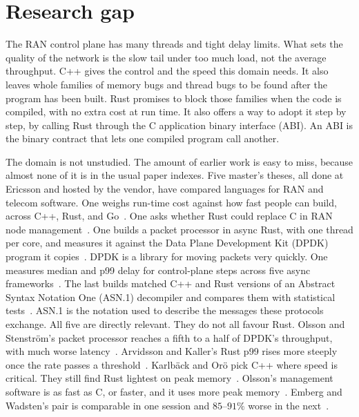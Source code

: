 \documentclass[english,oneside,a4paper,censored,csm,software-track-2020]{HYthesisML}
\begin{document}
\section{Research gap}\label{sec:gap}
The RAN control plane has many threads and tight delay limits.
What sets the quality of the network is the slow tail under too much load, not the average throughput.
C++ gives the control and the speed this domain needs.
It also leaves whole families of memory bugs and thread bugs to be found after the program has been built.
Rust promises to block those families when the code is compiled, with no extra cost at run time.
It also offers a way to adopt it step by step, by calling Rust through the C application binary interface (ABI).
An ABI is the binary contract that lets one compiled program call another.

The domain is not unstudied.
The amount of earlier work is easy to miss, because almost none of it is in the usual paper indexes.
Five master's theses, all done at Ericsson and hosted by the vendor, have compared languages for RAN and telecom software.
One weighs run-time cost against how fast people can build, across C++, Rust, and Go~\cite{karlback2021ran}.
One asks whether Rust could replace C in RAN node management~\cite{olsson2023ranmgmt}.
One builds a packet processor in async Rust, with one thread per core, and measures it against the Data Plane Development Kit (DPDK) program it copies~\cite{olsson2023asyncpackets}.
DPDK is a library for moving packets very quickly.
One measures median and p99 delay for control-plane steps across five async frameworks~\cite{arvidsson2025async}.
The last builds matched C++ and Rust versions of an Abstract Syntax Notation One (ASN.1) decompiler and compares them with statistical tests~\cite{emberg2023asn1}.
ASN.1 is the notation used to describe the messages these protocols exchange.
All five are directly relevant. They do not all favour Rust.
Olsson and Stenstr\"om's packet processor reaches a fifth to a half of DPDK's throughput, with much worse latency~\cite{olsson2023asyncpackets}.
Arvidsson and Kaller's Rust p99 rises more steeply once the rate passes a threshold~\cite{arvidsson2025async}.
Karlb\"ack and Or\"o pick C++ where speed is critical. They still find Rust lightest on peak memory~\cite{karlback2021ran}.
Olsson's management software is as fast as C, or faster, and it uses more peak memory~\cite{olsson2023ranmgmt}.
Emberg and Wadsten's pair is comparable in one session and $85$--$91\%$ worse in the next~\cite{emberg2023asn1}.
\end{document}
